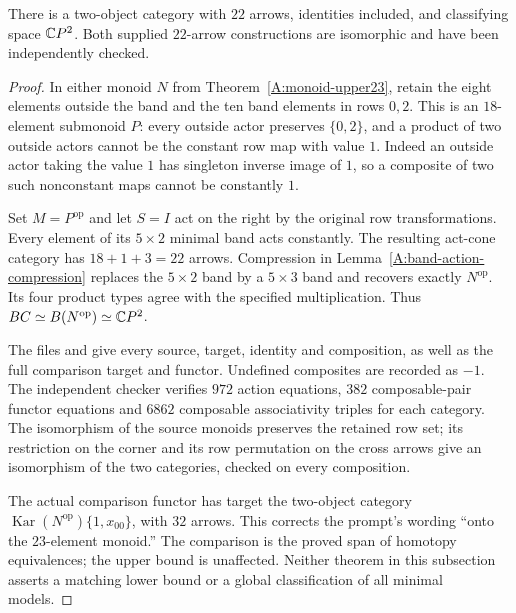 \begin{theorem}[Proved]\label{A:category-upper22}
There is a two-object category with $22$ arrows, identities included,
and classifying space $\mathbb{C}P^2$. Both supplied $22$-arrow constructions
are isomorphic and have been independently checked.
\end{theorem}
\begin{proof}
In either monoid $N$ from Theorem~\ref{A:monoid-upper23}, retain the
eight elements outside the band and the ten band elements in rows $0,2$.
This is an $18$-element submonoid $P$: every outside actor preserves
$\{0,2\}$, and a product of two outside actors cannot be the constant
row map with value $1$. Indeed an outside actor taking the value $1$
has singleton inverse image of $1$, so a composite of two such
nonconstant maps cannot be constantly $1$.

Set $M=P^{\mathrm{op}}$ and let $S=I$ act on the right by the original
row transformations. Every element of its $5\times2$ minimal band
acts constantly. The resulting act-cone category has $18+1+3=22$
arrows. Compression in Lemma~\ref{A:band-action-compression} replaces
the $5\times2$ band by a $5\times3$ band and recovers exactly
$N^{\mathrm{op}}$. Its four product types agree with the specified
multiplication. Thus $BC\simeq B(N^{\mathrm{op}})\simeq\mathbb{C}P^2$.

The files  and
 give every source,
target, identity and composition, as well as the full comparison target
and functor. Undefined composites are recorded as $-1$. The independent
checker verifies $972$ action equations, $382$ composable-pair functor
equations and $6862$ composable associativity triples for each category.
The isomorphism of the source monoids preserves the retained row set;
its restriction on the corner and its row permutation on the cross
arrows give an isomorphism of the two categories, checked on every
composition.

The actual comparison functor has target the two-object category
$\operatorname{Kar}(N^{\mathrm{op}})\{1,x_{00}\}$, with $32$ arrows.
This corrects the prompt's wording ``onto the $23$-element monoid.''
The comparison is the proved span of homotopy equivalences; the upper
bound is unaffected. Neither theorem in this subsection asserts a
matching lower bound or a global classification of all minimal models.
\end{proof}
